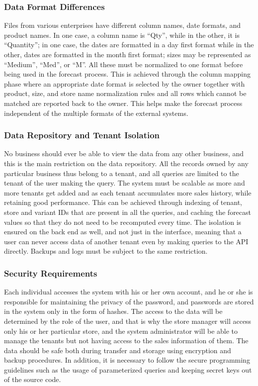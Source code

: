 \documentclass{StockSense}
\begin{document}
\subsubsection{Data Format Differences}

Files from various enterprises have different column names, date formats, and product names. In one case, a column name is ``Qty'', while in the other, it is ``Quantity''; in one case, the dates are formatted in a day first format while in the other, dates are formatted in the month first format; sizes may be represented as ``Medium'', ``Med'', or ``M''. All these must be normalized to one format before being used in the forecast process. This is achieved through the column mapping phase where an appropriate date format is selected by the owner together with product, size, and store name normalization rules and all rows which cannot be matched are reported back to the owner. This helps make the forecast process independent of the multiple formats of the external systems.

\subsubsection{Data Repository and Tenant Isolation}

No business should ever be able to view the data from any other business, and this is the main restriction on the data repository. All the records owned by any particular business thus belong to a tenant, and all queries are limited to the tenant of the user making the query. The system must be scalable as more and more tenants get added and as each tenant accumulates more sales history, while retaining good performance. This can be achieved through indexing of tenant, store and variant IDs that are present in all the queries, and caching the forecast values so that they do not need to be recomputed every time. The isolation is ensured on the back end as well, and not just in the interface, meaning that a user can never access data of another tenant even by making queries to the API directly. Backups and logs must be subject to the same restriction.

\subsubsection{Security Requirements}

Each individual accesses the system with his or her own account, and he or she is responsible for maintaining the privacy of the password, and passwords are stored in the system only in the form of hashes. The access to the data will be determined by the role of the user, and that is why the store manager will access only his or her particular store, and the system administrator will be able to manage the tenants but not having access to the sales information of them. The data should be safe both during transfer and storage using encryption and backup procedures. In addition, it is necessary to follow the secure programming guidelines such as the usage of parameterized queries and keeping secret keys out of the source code.
\end{document}
